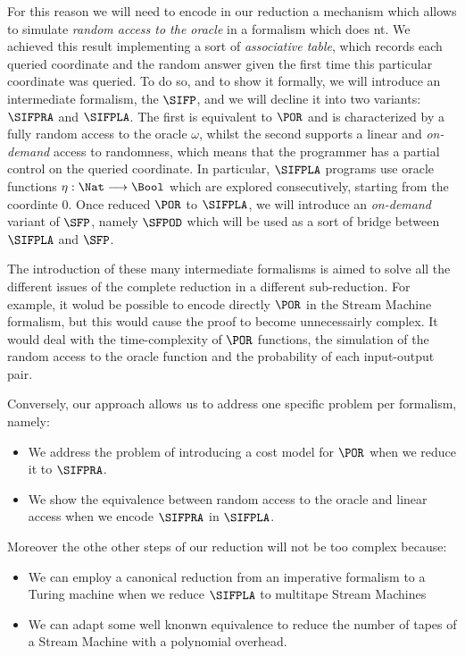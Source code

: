 For this reason we will need to encode in our reduction a mechanism which allows
to simulate \emph{random access to the oracle} in a formalism which does nt.
We achieved this result implementing a sort of \emph{associative table}, which
records each queried coordinate and the random answer given
the first time this particular coordinate was queried. To do so, and to show it
formally, we will introduce an intermediate formalism, the $\SIFP$, and we will
decline it into two variants: $\SIFPRA$ and $\SIFPLA$. The first is equivalent to
$\POR$ and is characterized by a fully random access to the oracle $\omega$,
whilst the second supports a linear and \emph{on-demand} access to randomness,
which means that the programmer has a partial control on the queried coordinate.
In particular, $\SIFPLA$ programs use oracle
functions $\eta: \Nat \longrightarrow \Bool$ which are explored consecutively,
starting from the coordinte $0$.
%
Once reduced $\POR$ to $\SIFPLA$, we will introduce an \emph{on-demand} variant
of $\SFP$, namely $\SFPOD$ which will be used as a sort of bridge between $\SIFPLA$
and $\SFP$.

The introduction of these many intermediate formalisms is aimed
to solve all the different issues of the complete reduction in a different
sub-reduction. For example, it wolud be possible to encode directly
$\POR$ in the Stream Machine formalism,
but this would cause the proof to become unnecessairly complex.
It would deal with the time-complexity of $\POR$ functions, the simulation
of the random access to the oracle function and the probability of each input-output
pair.

Conversely, our approach allows us to address one specific problem per formalism, namely:

\begin{itemize}
  \item We address the problem of introducing a
  cost model for $\POR$ when we reduce it to $\SIFPRA$.
  \item We show the equivalence between random access to
  the oracle and linear access when we encode $\SIFPRA$ in $\SIFPLA$.
\end{itemize}

Moreover the othe other steps of our reduction will not be too complex because:

\begin{itemize}
  \item We can employ a canonical reduction from an imperative formalism to
  a Turing machine when we reduce $\SIFPLA$ to multitape Stream Machines
  \item We can adapt some well knonwn equivalence to reduce the number of tapes
  of a Stream Machine with a polynomial overhead.
\end{itemize}




















